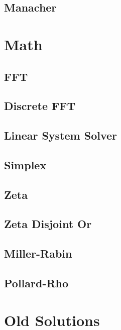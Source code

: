\documentclass[a4paper,oneside]{article}
\begin{document}
\subsection{Manacher}


\section{Math}
\subsection{FFT}


\subsection{Discrete FFT}


\subsection{Linear System Solver}


\subsection{Simplex}


\subsection{Zeta}


\subsection{Zeta Disjoint Or}


\subsection{Miller-Rabin}


\subsection{Pollard-Rho}


\section{Old Solutions}
\end{document}
